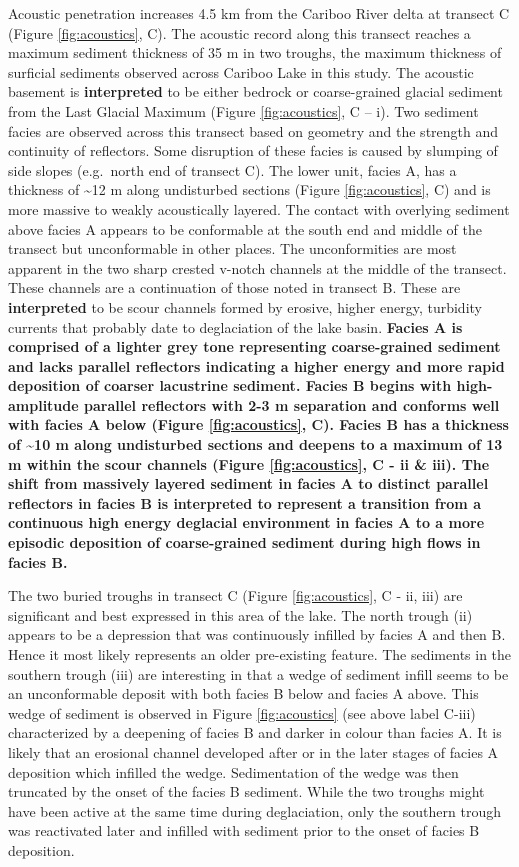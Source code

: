 \documentclass[Royal,times,doublespace,sageh]{sagej}
\begin{document}
Acoustic penetration increases 4.5 km from the Cariboo River delta at
transect C (Figure \ref{fig:acoustics}, C). The acoustic record along
this transect reaches a maximum sediment thickness of 35 m in two
troughs, the maximum thickness of surficial sediments observed across
Cariboo Lake in this study. The acoustic basement is
\textbf{interpreted} to be either bedrock or coarse-grained glacial
sediment from the Last Glacial Maximum (Figure \ref{fig:acoustics}, C --
i). Two sediment facies are observed across this transect based on
geometry and the strength and continuity of reflectors. Some disruption
of these facies is caused by slumping of side slopes (e.g.~north end of
transect C). The lower unit, facies A, has a thickness of
\textasciitilde12 m along undisturbed sections (Figure
\ref{fig:acoustics}, C) and is more massive to weakly acoustically
layered. The contact with overlying sediment above facies A appears to
be conformable at the south end and middle of the transect but
unconformable in other places. The unconformities are most apparent in
the two sharp crested v-notch channels at the middle of the transect.
These channels are a continuation of those noted in transect B. These
are \textbf{interpreted} to be scour channels formed by erosive, higher
energy, turbidity currents that probably date to deglaciation of the
lake basin. \textbf{Facies A is comprised of a lighter grey tone
representing coarse-grained sediment and lacks parallel reflectors
indicating a higher energy and more rapid deposition of coarser
lacustrine sediment. Facies B begins with high-amplitude parallel
reflectors with 2-3 m separation and conforms well with facies A below
(Figure \ref{fig:acoustics}, C). Facies B has a thickness of
\textasciitilde10 m along undisturbed sections and deepens to a maximum
of 13 m within the scour channels (Figure \ref{fig:acoustics}, C - ii \&
iii). The shift from massively layered sediment in facies A to distinct
parallel reflectors in facies B is interpreted to represent a transition
from a continuous high energy deglacial environment in facies A to a
more episodic deposition of coarse-grained sediment during high flows in
facies B.}

The two buried troughs in transect C (Figure \ref{fig:acoustics}, C -
ii, iii) are significant and best expressed in this area of the lake.
The north trough (ii) appears to be a depression that was continuously
infilled by facies A and then B. Hence it most likely represents an
older pre-existing feature. The sediments in the southern trough (iii)
are interesting in that a wedge of sediment infill seems to be an
unconformable deposit with both facies B below and facies A above. This
wedge of sediment is observed in Figure \ref{fig:acoustics} (see above
label C-iii) characterized by a deepening of facies B and darker in
colour than facies A. It is likely that an erosional channel developed
after or in the later stages of facies A deposition which infilled the
wedge. Sedimentation of the wedge was then truncated by the onset of the
facies B sediment. While the two troughs might have been active at the
same time during deglaciation, only the southern trough was reactivated
later and infilled with sediment prior to the onset of facies B
deposition.
\end{document}
